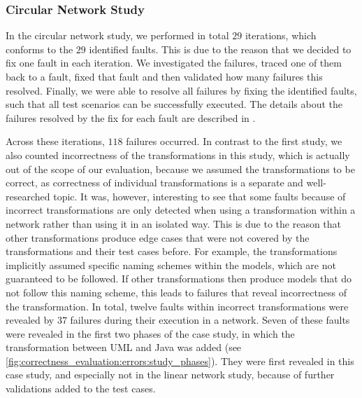 \subsubsection*{Circular Network Study} 

In the circular network study, we performed in total $29$ iterations, which conforms to the $29$ identified faults.
This is due to the reason that we decided to fix one fault in each iteration.
We investigated the failures, traced one of them back to a fault, fixed that fault and then validated how many failures this resolved.
Finally, we were able to resolve all failures by fixing the identified faults, such that all test scenarios can be successfully executed.
The details about the failures resolved by the fix for each fault are described in \cite{saglam2020ma}.

Across these iterations, $118$ failures occurred.
In contrast to the first study, we also counted incorrectness of the transformations in this study, which is actually out of the scope of our evaluation, because we assumed the transformations to be correct, as correctness of individual transformations is a separate and well-researched topic.
It was, however, interesting to see that some faults because of incorrect transformations are only detected when using a transformation within a network rather than using it in an isolated way.
This is due to the reason that other transformations produce edge cases that were not covered by the transformations and their test cases before.
For example, the transformations implicitly assumed specific naming schemes within the models, which are not guaranteed to be followed.
If other transformations then produce models that do not follow this naming scheme, this leads to failures that reveal incorrectness of the transformation.
In total, twelve faults within incorrect transformations were revealed by $37$ failures during their execution in a network.
Seven of these faults were revealed in the first two phases of the case study, in which the transformation between \gls{UML} and Java was added (see \autoref{fig:correctness_evaluation:errors:study_phases}).
They were first revealed in this case study, and especially not in the linear network study, because of further validations added to the test cases.

